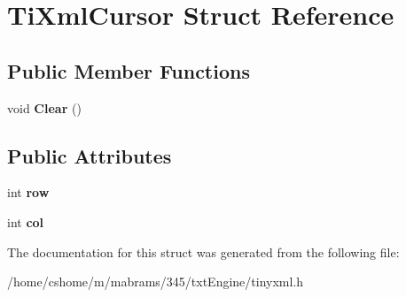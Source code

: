 \hypertarget{struct_ti_xml_cursor}{
\section{\-Ti\-Xml\-Cursor \-Struct \-Reference}
\label{struct_ti_xml_cursor}
}
\subsection*{\-Public \-Member \-Functions}
\begin{DoxyCompactItemize}
\item 
\hypertarget{struct_ti_xml_cursor_a1e6fa622b59dafb71b6efe595105dcdd}{
void {\bfseries \-Clear} ()}
\label{struct_ti_xml_cursor_a1e6fa622b59dafb71b6efe595105dcdd}

\end{DoxyCompactItemize}
\subsection*{\-Public \-Attributes}
\begin{DoxyCompactItemize}
\item 
\hypertarget{struct_ti_xml_cursor_a5b54dd949820c2db061e2be41f3effb3}{
int {\bfseries row}}
\label{struct_ti_xml_cursor_a5b54dd949820c2db061e2be41f3effb3}

\item 
\hypertarget{struct_ti_xml_cursor_a5694d7ed2c4d20109d350c14c417969d}{
int {\bfseries col}}
\label{struct_ti_xml_cursor_a5694d7ed2c4d20109d350c14c417969d}

\end{DoxyCompactItemize}


\-The documentation for this struct was generated from the following file\-:\begin{DoxyCompactItemize}
\item 
/home/cshome/m/mabrams/345/txt\-Engine/tinyxml.\-h\end{DoxyCompactItemize}
